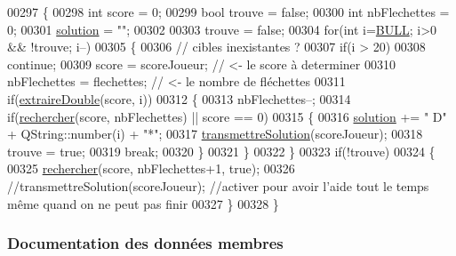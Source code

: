 \begin{DoxyCode}
00297 \{
00298     \textcolor{keywordtype}{int} score = 0;
00299     \textcolor{keywordtype}{bool} trouve = \textcolor{keyword}{false};
00300     \textcolor{keywordtype}{int} nbFlechettes = 0;
00301     \hyperlink{class_solution_a03b47dedfe8a8f8244f7e633cbaa30fb}{solution} = \textcolor{stringliteral}{""};
00302 
00303     trouve = \textcolor{keyword}{false};
00304     \textcolor{keywordflow}{for}(\textcolor{keywordtype}{int} i=\hyperlink{darts_8h_ac26e54839269cea6c170f2699af4ead2}{BULL}; i>0 && !trouve; i--)
00305     \{
00306         \textcolor{comment}{// cibles inexistantes ?}
00307         \textcolor{keywordflow}{if}(i > 20)
00308             \textcolor{keywordflow}{continue};
00309         score = scoreJoueur; \textcolor{comment}{// <- le score à determiner}
00310         nbFlechettes = flechettes; \textcolor{comment}{// <- le nombre de fléchettes}
00311         \textcolor{keywordflow}{if}(\hyperlink{class_solution_a34c3bf5ce00cdf428f2e07741806499d}{extraireDouble}(score, i))
00312         \{
00313             nbFlechettes--;
00314             \textcolor{keywordflow}{if}(\hyperlink{class_solution_a857b1b362fc0d5eb08e2eb7302dce27f}{rechercher}(score, nbFlechettes) || score == 0)
00315             \{
00316                 \hyperlink{class_solution_a03b47dedfe8a8f8244f7e633cbaa30fb}{solution} += \textcolor{stringliteral}{" D"} + QString::number(i) + \textcolor{stringliteral}{"*"};
00317                 \hyperlink{class_solution_a334ffddf70bd379a0af7c7e93750d6b5}{transmettreSolution}(scoreJoueur);
00318                 trouve = \textcolor{keyword}{true};
00319                 \textcolor{keywordflow}{break};
00320             \}
00321         \}
00322     \}
00323     \textcolor{keywordflow}{if}(!trouve)
00324     \{
00325         \hyperlink{class_solution_a857b1b362fc0d5eb08e2eb7302dce27f}{rechercher}(score, nbFlechettes+1, \textcolor{keyword}{true});
00326         \textcolor{comment}{//transmettreSolution(scoreJoueur);       //activer pour avoir l'aide tout le temps même quand on
       ne peut pas finir}
00327     \}
00328 \}
\end{DoxyCode}


\subsubsection{Documentation des données membres}
\mbox{\label{class_solution_a03b47dedfe8a8f8244f7e633cbaa30fb}} 

